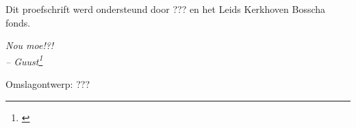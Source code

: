 \noindent Dit proefschrift werd ondersteund door ??? 
en het Leids Kerkhoven Bosscha fonds.

\newpage
\begin{flushright}
\noindent
{}
\vspace*{\fill}

\textit{\large Nou moe!?!\\
  -- Guust\footnote{\cite{Franquin}}}
\vspace*{\fill}
\end{flushright}
\newpage

\vspace*{\fill}

Omslagontwerp: ???

\pagestyle{fancy}
\newpage
\normalsize

